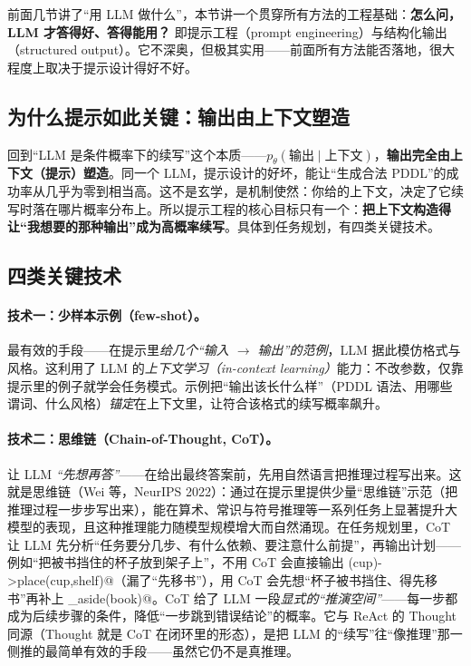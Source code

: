 前面几节讲了“用 LLM 做什么”，本节讲一个贯穿所有方法的工程基础：\textbf{怎么问，LLM 才答得好、答得能用？} 即提示工程（prompt engineering）与结构化输出（structured output）。它不深奥，但极其实用——前面所有方法能否落地，很大程度上取决于提示设计得好不好。

\subsection{为什么提示如此关键：输出由上下文塑造}
\label{sec:prompt-why}

回到“LLM 是条件概率下的续写”这个本质——$p_\theta(\text{输出}\mid \text{上下文})$，\textbf{输出完全由上下文（提示）塑造}。同一个 LLM，提示设计的好坏，能让“生成合法 PDDL”的成功率从几乎为零到相当高。这不是玄学，是机制使然：你给的上下文，决定了它续写时落在哪片概率分布上。所以提示工程的核心目标只有一个：\textbf{把上下文构造得让“我想要的那种输出”成为高概率续写}。具体到任务规划，有四类关键技术。

\subsection{四类关键技术}
\label{sec:prompt-techniques}

\paragraph{技术一：少样本示例（few-shot）。}
最有效的手段——在提示里\emph{给几个“输入 $\to$ 输出”的范例}，LLM 据此模仿格式与风格。这利用了 LLM 的\emph{上下文学习（in-context learning）}能力：不改参数，仅靠提示里的例子就学会任务模式。示例把“输出该长什么样”（PDDL 语法、用哪些谓词、什么风格）\emph{锚定}在上下文里，让符合该格式的续写概率飙升。

\paragraph{技术二：思维链（Chain-of-Thought, CoT）。}
让 LLM \emph{“先想再答”}——在给出最终答案前，先用自然语言把推理过程写出来。这就是思维链（Wei 等，NeurIPS 2022）：通过在提示里提供少量“思维链”示范（把推理过程一步步写出来），能在算术、常识与符号推理等一系列任务上显著提升大模型的表现，且这种推理能力随模型规模增大而自然涌现\cite{wei2022cot}。在任务规划里，CoT 让 LLM 先分析“任务要分几步、有什么依赖、要注意什么前提”，再输出计划——例如“把被书挡住的杯子放到架子上”，不用 CoT 会直接输出 \verb@pick(cup)->place(cup,shelf)@（漏了“先移书”），用 CoT 会先想“杯子被书挡住、得先移书”再补上 \verb@move_aside(book)@。CoT 给了 LLM 一段\emph{显式的“推演空间”}——每一步都成为后续步骤的条件，降低“一步跳到错误结论”的概率。它与 ReAct 的 Thought 同源（Thought 就是 CoT 在闭环里的形态），是把 LLM 的“续写”往“像推理”那一侧推的最简单有效的手段——虽然它仍不是真推理。

